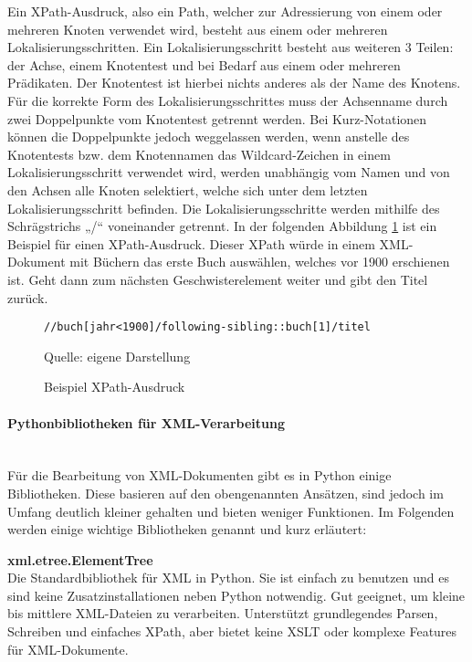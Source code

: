Ein XPath-Ausdruck, also ein Path, welcher zur Adressierung von einem oder mehreren Knoten verwendet wird,
besteht aus einem oder mehreren Lokalisierungsschritten.
Ein Lokalisierungsschritt besteht aus weiteren 3 Teilen: der Achse, einem Knotentest und bei Bedarf aus einem oder mehreren Prädikaten.
Der Knotentest ist hierbei nichts anderes als der Name des Knotens.
Für die korrekte Form des Lokalisierungsschrittes muss der Achsenname durch zwei Doppelpunkte vom Knotentest getrennt werden.
Bei Kurz-Notationen können die Doppelpunkte jedoch weggelassen werden, wenn anstelle des Knotentests bzw.
dem Knotennamen das Wildcard-Zeichen in einem Lokalisierungsschritt verwendet wird,
werden unabhängig vom Namen und von den Achsen alle Knoten selektiert, welche sich unter dem letzten Lokalisierungsschritt befinden.
Die Lokalisierungsschritte werden mithilfe des Schrägstrichs „/“ voneinander getrennt. \cite{XPath2025}
In der folgenden Abbildung \ref{fig: XPath-Ausdruck} ist ein Beispiel für einen XPath-Ausdruck.
Dieser XPath würde in einem XML-Dokument mit Büchern das erste Buch auswählen, welches vor 1900 erschienen ist.
Geht dann zum nächsten Geschwisterelement weiter und gibt den Titel zurück.


\begin{figure}[H]
\centering
\begin{minipage}{0.95\textwidth}
\begin{lstlisting}[language=XPath]
//buch[jahr<1900]/following-sibling::buch[1]/titel
\end{lstlisting}
\end{minipage}
\caption{Beispiel XPath-Ausdruck}
\label{fig: XPath-Ausdruck}
    {Quelle: eigene Darstellung}
\end{figure}


\paragraph{Pythonbibliotheken für XML-Verarbeitung}\mbox{}\\

Für die Bearbeitung von \ac{XML}-Dokumenten gibt es in Python einige Bibliotheken.
Diese basieren auf den obengenannten Ansätzen, sind jedoch im Umfang deutlich kleiner gehalten und bieten weniger Funktionen.
Im Folgenden werden einige wichtige Bibliotheken genannt und kurz erläutert:

\textbf{xml.etree.ElementTree}\\
Die Standardbibliothek für XML in Python.
Sie ist einfach zu benutzen und es sind keine Zusatzinstallationen neben Python notwendig.
Gut geeignet, um kleine bis mittlere XML-Dateien zu verarbeiten.
Unterstützt grundlegendes Parsen, Schreiben und einfaches XPath, aber bietet keine \ac{XSLT} oder komplexe Features für \ac{XML}-Dokumente. \cite*{ElementTree2025}

